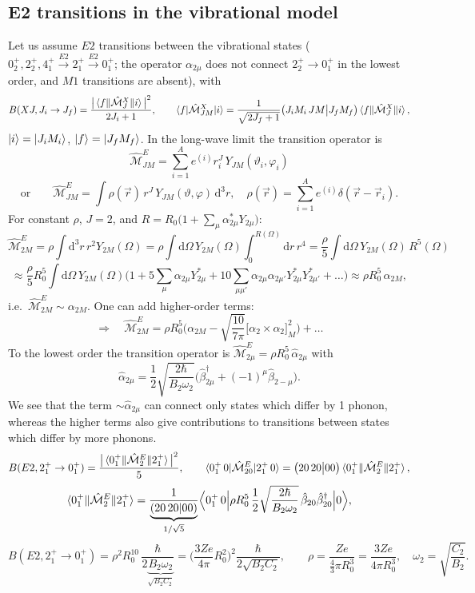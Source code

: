 \documentclass[11pt,a4paper]{article}
\newcommand{\op}[1]{\hat{#1}}
\newcommand{\ud}{\mathrm{d}}
\begin{document}
\subsection{E2 transitions in the vibrational model}
Let us assume $E2$ transitions between the vibrational states ($0^+_2,2^+_2,4^+_1\xrightarrow{E2}2^+_1\xrightarrow{E2}0^+_1$; the operator $\alpha_{2\mu}$ does not connect $2^+_2\to0^+_1$ in the lowest order, and $M1$ transitions are absent), with
\[
B(XJ,J_i\to J_f)=\frac{\big|\braket{f\|\op{\mathcal M}^X_J\|i}\big|^2}{2J_i+1},\qquad
\braket{f|\op{\mathcal M}^X_{JM}|i}=\frac{1}{\sqrt{2J_f+1}}\big(J_iM_i\,JM\big|J_fM_f\big)\braket{f\|\op{\mathcal M}^X_J\|i},
\]
$\ket i=\ket{J_iM_i}$, $\ket f=\ket{J_fM_f}$. In the long-wave limit the transition operator is
\[
\op{\mathcal M}^E_{JM}=\sum_{i=1}^Ae^{(i)}r_i^J\,Y_{JM}(\vartheta_i,\varphi_i)
\]
\[
\text{or}\qquad\op{\mathcal M}^E_{JM}=\int\rho(\vec r)\,r^J\,Y_{JM}(\vartheta,\varphi)\,\ud^3r,\quad
\rho(\vec r)=\sum_{i=1}^Ae^{(i)}\delta(\vec r-\vec r_i).
\]
For constant $\rho$, $J=2$, and $R=R_0\big(1+\sum_\mu\alpha^*_{2\mu}Y_{2\mu}\big)$:
\[
\op{\mathcal M}^E_{2M}=\rho\int\ud^3r\,r^2Y_{2M}(\Omega)=\rho\int\ud\Omega\,Y_{2M}(\Omega)\int_0^{R(\Omega)}\ud r\,r^4
=\frac\rho5\int\ud\Omega\,Y_{2M}(\Omega)\,R^5(\Omega)
\]
\[
\approx\frac\rho5R_0^5\int\ud\Omega\,Y_{2M}(\Omega)\Big(1+5\sum_\mu\alpha_{2\mu}Y^*_{2\mu}+10\sum_{\mu\mu'}\alpha_{2\mu}\alpha_{2\mu'}Y^*_{2\mu}Y^*_{2\mu'}+\dots\Big)
\approx\rho R_0^5\,\alpha_{2M},
\]
i.e.\ $\op{\mathcal M}^E_{2M}\sim\alpha_{2M}$. One can add higher-order terms:
\[
\Rightarrow\quad \op{\mathcal M}^E_{2M}=\rho R_0^5\Big(\alpha_{2M}-\sqrt{\frac{10}{7\pi}}\big[\alpha_2\times\alpha_2\big]^2_M\Big)+\dots
\]
To the lowest order the transition operator is $\op{\mathcal M}^E_{2\mu}=\rho R_0^5\,\op\alpha_{2\mu}$ with
\[
\op\alpha_{2\mu}=\frac12\sqrt{\frac{2\hbar}{B_2\omega_2}}\Big(\op\beta^\dagger_{2\mu}+(-1)^\mu\op\beta_{2-\mu}\Big).
\]
We see that the term $\sim\op\alpha_{2\mu}$ can connect only states which differ by 1 phonon, whereas the higher terms also give contributions to transitions between states which differ by more phonons.
\[
B(E2,2^+_1\to0^+_1)=\frac{\big|\braket{0^+_1\|\op{\mathcal M}^E_2\|2^+_1}\big|^2}{5},
\qquad
\braket{0^+_1\,0|\op{\mathcal M}^E_{20}|2^+_1\,0}=\big(20\,20\big|00\big)\braket{0^+_1\|\op{\mathcal M}^E_2\|2^+_1},
\]
\[
\braket{0^+_1\|\op{\mathcal M}^E_2\|2^+_1}=\frac{1}{\underbrace{(20\,20|00)}_{1/\sqrt5}}\Big\langle0^+_1\,0\Big|\rho R_0^5\,\frac12\sqrt{\frac{2\hbar}{B_2\omega_2}}\,\op\beta_{20}\op\beta^\dagger_{20}\Big|0\Big\rangle ,
\]
\[
B(E2,2^+_1\to0^+_1)=\rho^2R_0^{10}\,\frac{\hbar}{2\underbrace{B_2\omega_2}_{\sqrt{B_2C_2}}}
=\Big(\frac{3Ze}{4\pi}R_0^2\Big)^2\frac{\hbar}{2\sqrt{B_2C_2}},
\qquad \rho=\frac{Ze}{\frac43\pi R_0^3}=\frac{3Ze}{4\pi R_0^3},\quad \omega_2=\sqrt{\frac{C_2}{B_2}} .
\]
\end{document}
